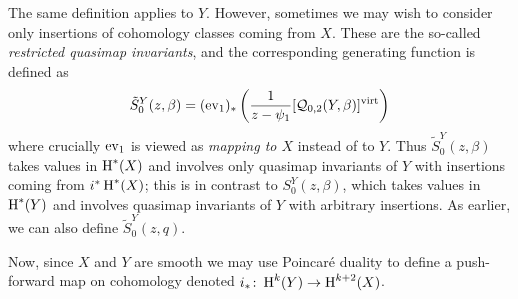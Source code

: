 The same definition applies to $Y$. However, sometimes we may wish to consider only insertions of cohomology classes coming from $X$. These are the so-called \emph{restricted quasimap invariants}, and the corresponding generating function is defined as
\begin{equation*} \tilde{S}^Y_0(z,\beta) = (\operatorname{ev}_1)_* \left( \dfrac{1}{z-\psi_1} [\mathcal{Q}_{0,2}(Y,\beta)]^{\operatorname{virt}} \right) \end{equation*}
where crucially $\operatorname{ev}_1$ is viewed as \emph{mapping to $X$} instead of to $Y$. Thus $\tilde{S}^Y_0(z,\beta)$ takes values in $\operatorname{H}^*(X)$ and involves only quasimap invariants of $Y$ with insertions coming from $i^*\operatorname{H}^*(X)$; this is in contrast to $S^Y_0(z,\beta)$, which takes values in $\operatorname{H}^*(Y)$ and involves quasimap invariants of $Y$ with arbitrary insertions. As earlier, we can also define $\tilde{S}_0^Y(z,q)$.

Now, since $X$ and $Y$ are smooth we may use Poincar\'{e} duality to define a push-forward map on cohomology denoted $i_* \colon \operatorname{H}^k(Y) \rightarrow \operatorname{H}^{k+2}(X)$.

